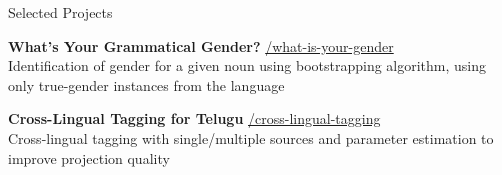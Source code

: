 
\begin{rSection}{Selected Projects}

    {\textbf{What's Your Grammatical Gender?}} \hfill {\href{https://github.com/Akshayanti/what-is-your-gender}{\faGithub/what-is-your-gender}}\\
        Identification of gender for a given noun using bootstrapping algorithm, using only true-gender instances from the language

    {\textbf{Cross-Lingual Tagging for Telugu}} \hfill
    \href{https://github.com/Akshayanti/cross-lingual-tagging}{\faGithub/cross-lingual-tagging}\\
        Cross-lingual tagging with single/multiple sources and parameter estimation to improve projection quality

\end{rSection}